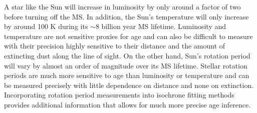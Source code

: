 
A star like the Sun will increase in luminosity by only around a factor of two
before turning off the MS.
In addition, the Sun's temperature will only increase by around 100 K during
its $\sim$8 billion year MS lifetime.
Luminosity and temperature are not sensitive proxies for age and can also be
difficult to measure with their precision highly sensitive to their distance
and the amount of extincting dust along the line of sight.
On the other hand, Sun's rotation period will vary by almost an order of
magnitude over its MS lifetime.
Stellar rotation periods are much more sensitive to age than luminosity or
temperature and can be measured precisely with little dependence on distance
and none on extinction.
Incorporating rotation period measurements into isochrone fitting methods
provides additional information that allows for much more precise age
inference.

